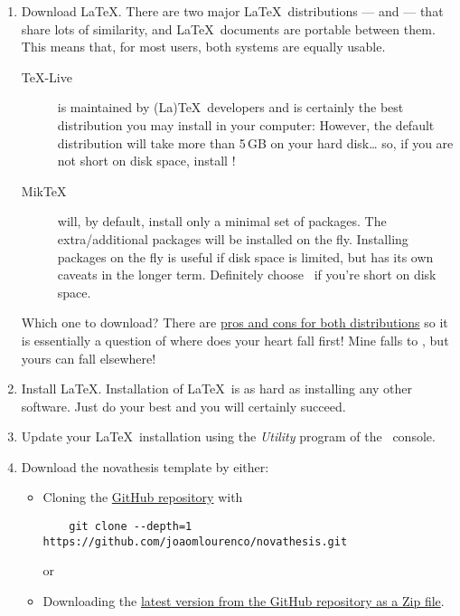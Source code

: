 \begin{enumerate}
  \item Download \LaTeX.  There are two major \LaTeX\ distributions — \href{https://miktex.org/}{\MikTeX} and \href{https://www.tug.org/texlive/}{\TeXLive} — that share lots of similarity, and \LaTeX\ documents are portable between them. This means that, for most users, both systems are equally usable.
        \begin{description}
          \item [\TeX-Live] is maintained by (La)\TeX\ developers and is certainly the best distribution you may install in your computer:  However, the default distribution will take more than 5\,GB on your hard disk… so, if you are not short on disk space, install \TeXLive!
          \item[Mik\TeX] will, by default, install only a minimal set of packages. The extra/additional packages will be installed on the fly.  Installing packages on the fly is useful if disk space is limited, but has its own caveats in the longer term.  Definitely choose \MikTeX\ if you're short on disk space.
        \end{description}
        Which one to download?  There are \href{https://tex.stackexchange.com/questions/20036/what-are-the-advantages-of-tex-live-over-miktex}{pros and cons for both distributions} so it is essentially a question of where does your heart fall first!  Mine falls to \TeXLive, but yours can fall elsewhere!  \emojiSmile
  \item Install \LaTeX. Installation of \LaTeX\ is as hard as installing any other software.  Just do your best and you will certainly succeed.
  \item Update your \LaTeX\ installation using the \emph{\TeXLive Utility} program of the \MikTeX\ console.
  \item Download the \gls{novathesis} template by either:
        \begin{itemize}
          \item Cloning the \href{https://github.com/joaomlourenco/novathesis}{GitHub repository} with
                \begin{verbatim}    git clone --depth=1 https://github.com/joaomlourenco/novathesis.git\end{verbatim}
                or
          \item Downloading the \href{https://github.com/joaomlourenco/novathesis/archive/main.zip}{latest version from the GitHub repository as a Zip file}.
        \end{itemize}


\end{enumerate}
